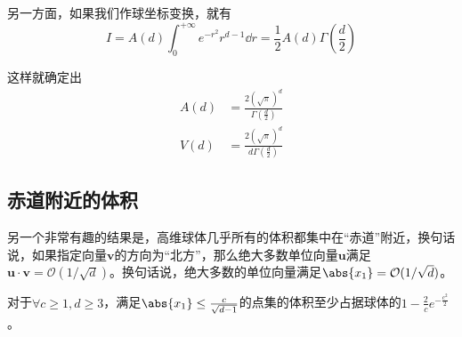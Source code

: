 \documentclass[UTF8]{ctexbook}
\begin{document}
另一方面，如果我们作球坐标变换，就有
\begin{equation}
I = A(d) \int_{0}^{+\infty} e^{-r^2} r^{d-1} \dd r = \frac{1}{2}A(d)\Gamma(\frac{d}{2})
\end{equation}

这样就确定出
\begin{equation}
\begin{split}
A(d) &= \frac{2(\sqrt{\pi})^d}{\Gamma(\frac{d}{2})}
\\
V(d) &= \frac{2(\sqrt{\pi})^d}{d\Gamma(\frac{d}{2})}
\end{split}
\end{equation}


	\subsection{赤道附近的体积}

	另一个非常有趣的结果是，高维球体几乎所有的体积都集中在“赤道”附近，换句话说，如果指定向量$\bm v$的方向为“北方”，那么绝大多数单位向量$\bm u$满足$\bm{u\cdot v} = \mathcal O(1/\sqrt{d})$。换句话说，绝大多数的单位向量满足$\abs{x_1} = \mathcal{O}(1/\sqrt d)$。

\begin{thm}
对于$\forall c \ge 1, d \ge 3$，满足$\abs{x_1} \le \frac{c}{\sqrt{d-1}}$的点集的体积至少占据球体的$1-\frac{2}{c} e^{-\frac{c^2}{2}}$。

\end{thm}
\end{document}
